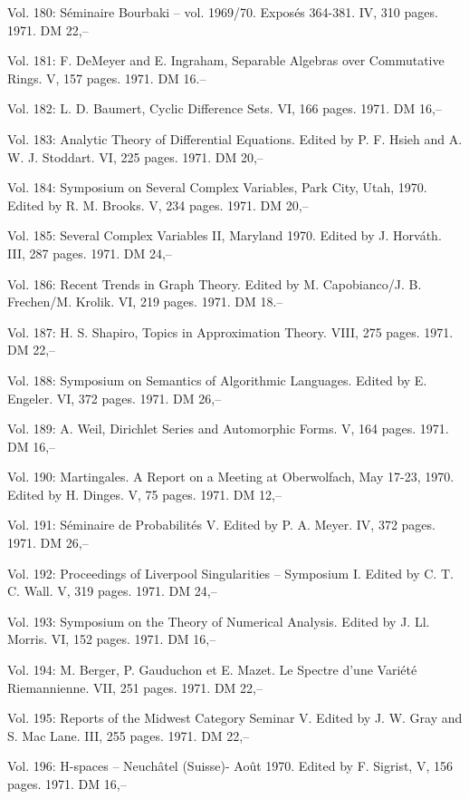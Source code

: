 Vol. 180: Séminaire Bourbaki -- vol. 1969/70. Exposés 364-381. IV, 310 pages. 1971. DM 22,--

Vol. 181: F. DeMeyer and E. Ingraham, Separable Algebras over Commutative Rings. V, 157 pages. 1971. DM 16.--

Vol. 182: L. D. Baumert, Cyclic Difference Sets. VI, 166 pages. 1971. DM 16,--

Vol. 183: Analytic Theory of Differential Equations. Edited by P. F. Hsieh and A. W. J. Stoddart. VI, 225 pages. 1971. DM 20,--

Vol. 184: Symposium on Several Complex Variables, Park City, Utah, 1970. Edited by R. M. Brooks. V, 234 pages. 1971. DM 20,--

Vol. 185: Several Complex Variables II, Maryland 1970. Edited by J. Horváth. III, 287 pages. 1971. DM 24,--

Vol. 186: Recent Trends in Graph Theory. Edited by M. Capobianco/J. B. Frechen/M. Krolik. VI, 219 pages. 1971. DM 18.--

Vol. 187: H. S. Shapiro, Topics in Approximation Theory. VIII, 275 pages. 1971. DM 22,--

Vol. 188: Symposium on Semantics of Algorithmic Languages. Edited by E. Engeler. VI, 372 pages. 1971. DM 26,--

Vol. 189: A. Weil, Dirichlet Series and Automorphic Forms. V, 164 pages. 1971. DM 16,--

Vol. 190: Martingales. A Report on a Meeting at Oberwolfach, May 17-23, 1970. Edited by H. Dinges. V, 75 pages. 1971. DM 12,--

Vol. 191: Séminaire de Probabilités V. Edited by P. A. Meyer. IV, 372 pages. 1971. DM 26,--

Vol. 192: Proceedings of Liverpool Singularities -- Symposium I. Edited by C. T. C. Wall. V, 319 pages. 1971. DM 24,--

Vol. 193: Symposium on the Theory of Numerical Analysis. Edited by J. Ll. Morris. VI, 152 pages. 1971. DM 16,--

Vol. 194: M. Berger, P. Gauduchon et E. Mazet. Le Spectre d'une Variété Riemannienne. VII, 251 pages. 1971. DM 22,--

Vol. 195: Reports of the Midwest Category Seminar V. Edited by J. W. Gray and S. Mac Lane. III, 255 pages. 1971. DM 22,--

Vol. 196: H-spaces -- Neuchâtel (Suisse)- Août 1970. Edited by F. Sigrist, V, 156 pages. 1971. DM 16,--

